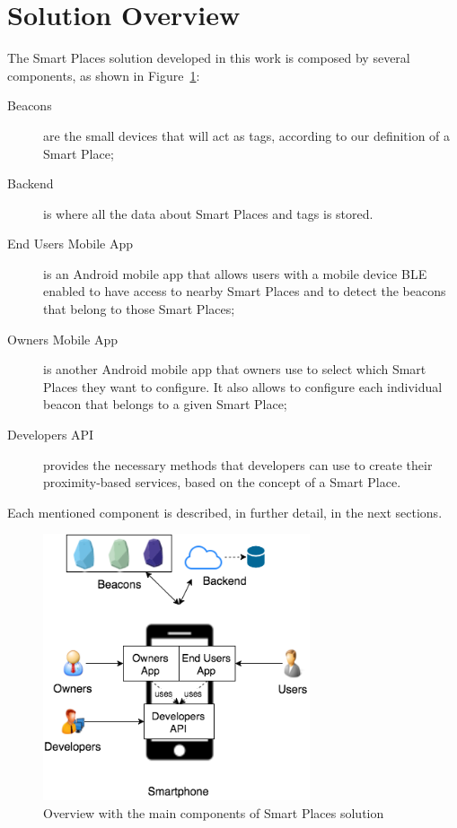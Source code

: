 \section{Solution Overview}
\label{sec:solution_solution_overview}
The Smart Places solution developed in this work is composed by several components, as shown in Figure~\ref{fig:solution_overview}:
\begin{description}
  \item[Beacons]
  are the small devices that will act as tags, according to our definition of a Smart Place;
  \item[Backend]
  is where all the data about Smart Places and tags is stored.
  \item[End Users Mobile App]
  is an Android mobile app that allows users with a mobile device \gls{BLE} enabled to have access to nearby Smart Places and to detect the beacons that belong to those Smart Places;
  \item[Owners Mobile App] is another Android mobile app that owners use to select which Smart Places they want to configure. It also allows to configure each individual beacon that belongs to a given Smart Place;
  \item[Developers \gls{API}] provides the necessary methods that developers can use to create their proximity-based services, based on the concept of a Smart Place.
\end{description}
Each mentioned component is described, in further detail, in the next sections.

\begin{figure}[!ht]
  \centering
    \includegraphics[width=0.7\textwidth, keepaspectratio]{images/smart_places_solution_overview}
    \caption[Solution Overview]{Overview with the main components of Smart Places solution}
    \label{fig:solution_overview}
\end{figure}


